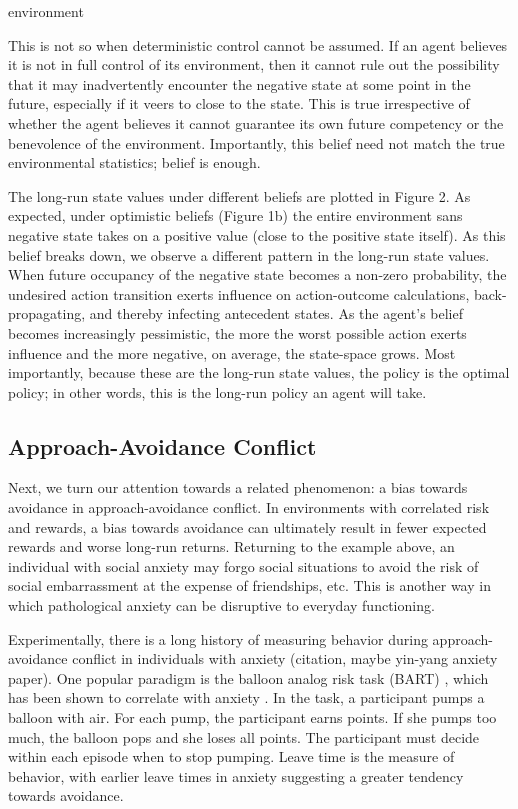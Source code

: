 environment\documentclass[11pt]{article} %
\begin{document}
This is not so when deterministic control cannot be assumed. If an agent believes
it is not in full control of its environment, then it cannot rule out the possibility
that it may inadvertently encounter the negative state at some point in the future,
especially if it veers to close to the state. This is true irrespective of whether
the agent believes it cannot guarantee its own future competency or the benevolence
of the environment. Importantly, this belief need not match the true environmental
statistics; belief is enough.

The long-run state values under different beliefs are plotted in Figure 2. As
expected, under optimistic beliefs (Figure 1b) the entire environment sans negative
state takes on a positive value (close to the positive state itself). As this belief
breaks down, we observe a different pattern in the long-run state values. When
future occupancy of the negative state becomes a non-zero probability, the undesired
action transition exerts influence on action-outcome calculations, back-propagating,
and thereby infecting antecedent states. As the agent's belief becomes increasingly
pessimistic, the more the worst possible action exerts influence and the more
negative, on average, the state-space grows. Most importantly, because these are
the long-run state values, the policy is the optimal policy; in other words, this
is the long-run policy an agent will take.

\subsection{Approach-Avoidance Conflict}

Next, we turn our attention towards a related phenomenon: a bias towards avoidance
in approach-avoidance conflict. In environments with correlated risk and rewards,
a bias towards avoidance can ultimately result in fewer expected rewards and worse
long-run returns. Returning to the example above, an individual with social anxiety
may forgo social situations to avoid the risk of social embarrassment at the expense
of friendships, etc. This is another way in which pathological anxiety can be
disruptive to everyday functioning.

Experimentally, there is a long history of measuring behavior during
approach-avoidance conflict in individuals with anxiety (citation, maybe yin-yang anxiety paper).
One popular paradigm is the balloon analog risk task (BART) \citep{Lejuez2002},
which has been shown to correlate with anxiety \cite{Maner2007, Giorgetta2012}.
In the task, a participant pumps a balloon with air. For each pump, the participant
earns points. If she pumps too much, the balloon pops and she loses all points.
The participant must decide within each episode when to stop pumping. Leave time
is the measure of behavior, with earlier leave times in anxiety suggesting a
greater tendency towards avoidance.
\end{document}

